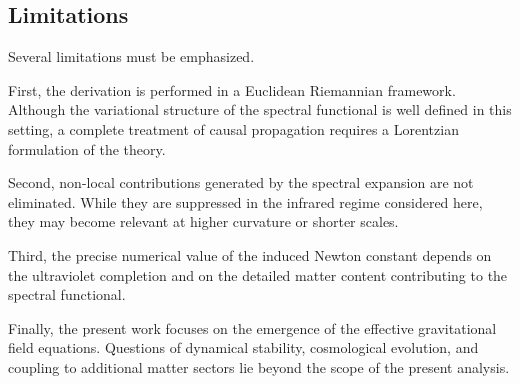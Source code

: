 \subsection{Limitations}
  \label{subsec:limitations}

  Several limitations must be emphasized.

  First, the derivation is performed in a Euclidean Riemannian framework.
  Although the variational structure of the spectral functional is well defined
  in this setting, a complete treatment of causal propagation requires a
  Lorentzian formulation of the theory.

  Second, non-local contributions generated by the spectral expansion are not
  eliminated.
  While they are suppressed in the infrared regime considered here,
  they may become relevant at higher curvature or shorter scales.

  Third, the precise numerical value of the induced Newton constant depends on
  the ultraviolet completion and on the detailed matter content contributing to
  the spectral functional.

  Finally, the present work focuses on the emergence of the effective
  gravitational field equations.
  Questions of dynamical stability, cosmological evolution, and coupling to
  additional matter sectors lie beyond the scope of the present analysis.
